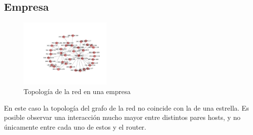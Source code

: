 \subsection{Empresa}

\begin{figure}
\vspace{-35pt}
\hspace{-35pt}
\centering
   \includegraphics[width=0.4\textwidth]{resultados/empresa/conectividadNX.pdf}
\vspace{-30pt}
   \caption{Topología de la red en una empresa}
\end{figure}

En este caso la topología del grafo de la red no coincide con la de una estrella. Es posible observar una interacción mucho mayor entre distintos pares hosts, y no únicamente
entre cada uno de estos y el router.

